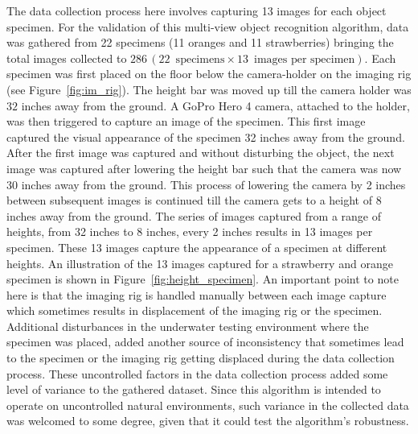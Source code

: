 The data collection process here involves capturing 13 images for each object specimen. For the validation of this multi-view object recognition algorithm, data was gathered from 22 specimens (11 oranges and 11 strawberries) bringing the total images collected to $286\, (22\enspace \text{specimens} \times 13\enspace \text{images per specimen})$. Each specimen was first placed on the floor below the camera-holder on the imaging rig (see Figure~\ref{fig:im_rig}). The height bar was moved up till the camera holder was $32$ inches away from the ground. A GoPro Hero 4 camera, attached to the holder, was then triggered to capture an image of the specimen. This first image captured the visual appearance of the specimen 32 inches away from the ground. After the first image was captured and without disturbing the object, the next image was captured after lowering the height bar such that the camera was now $30$ inches away from the ground.
This process of lowering the camera by 2 inches between subsequent images is continued till the camera gets to a height of $8$ inches away from the ground. 
The series of images captured from a range of heights, from 32 inches to 8 inches, every 2 inches results in 13 images per specimen. 
These 13 images capture the appearance of a specimen at different heights. An illustration of the 13 images captured for a strawberry and orange specimen is shown in Figure~\ref{fig:height_specimen}. An important point to note here is that the imaging rig is handled manually between each image capture which sometimes results in displacement of the imaging rig or the specimen. 
Additional disturbances in the underwater testing environment where the specimen was placed, added another source of inconsistency that sometimes lead to the specimen or the imaging rig getting displaced during the data collection process. These uncontrolled factors in the data collection process added some level of variance to the gathered dataset.
Since this algorithm is intended to operate on uncontrolled natural environments, such variance in the collected data was welcomed to some degree, given that it could test the algorithm's robustness.

